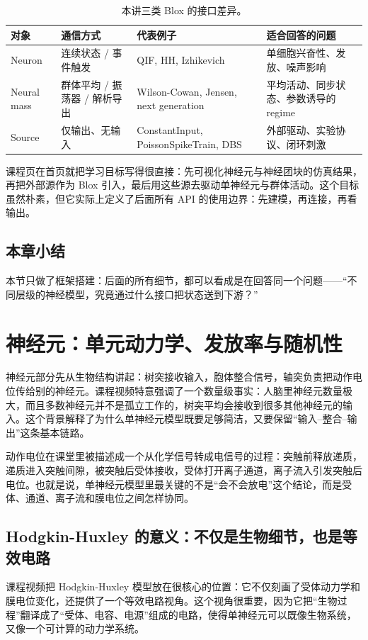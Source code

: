 \documentclass[a4paper]{article}
\begin{document}
\begin{table}[H]
\centering
\begin{tabular}{@{}llll@{}}
\toprule
对象 & 通信方式 & 代表例子 & 适合回答的问题 \\
\midrule
Neuron & 连续状态 / 事件触发 & QIF, HH, Izhikevich & 单细胞兴奋性、发放、噪声影响 \\
Neural mass & 群体平均 / 振荡器 / 解析导出 & Wilson-Cowan, Jensen, next generation & 平均活动、同步状态、参数诱导的 regime \\
Source & 仅输出、无输入 & ConstantInput, PoissonSpikeTrain, DBS & 外部驱动、实验协议、闭环刺激 \\
\bottomrule
\end{tabular}
\caption{本讲三类 Blox 的接口差异。}
\end{table}

课程页在首页就把学习目标写得很直接：先可视化神经元与神经团块的仿真结果，再把外部源作为 Blox 引入，最后用这些源去驱动单神经元与群体活动。这个目标虽然朴素，但它实际上定义了后面所有 API 的使用边界：先建模，再连接，再看输出。

\subsection{本章小结}
本节只做了框架搭建：后面的所有细节，都可以看成是在回答同一个问题——“不同层级的神经模型，究竟通过什么接口把状态送到下游？”

\section{神经元：单元动力学、发放率与随机性}
神经元部分先从生物结构讲起：树突接收输入，胞体整合信号，轴突负责把动作电位传给别的神经元。课程视频特意强调了一个数量级事实：人脑里神经元数量极大，而且多数神经元并不是孤立工作的，树突平均会接收到很多其他神经元的输入。这个背景解释了为什么单神经元模型既要足够简洁，又要保留“输入--整合--输出”这条基本链路。

动作电位在课堂里被描述成一个从化学信号转成电信号的过程：突触前释放递质，递质进入突触间隙，被突触后受体接收，受体打开离子通道，离子流入引发突触后电位。也就是说，单神经元模型里最关键的不是“会不会放电”这个结论，而是受体、通道、离子流和膜电位之间怎样协同。

\subsection{Hodgkin-Huxley 的意义：不仅是生物细节，也是等效电路}
课程视频把 Hodgkin-Huxley 模型放在很核心的位置：它不仅刻画了受体动力学和膜电位变化，还提供了一个等效电路视角。这个视角很重要，因为它把“生物过程”翻译成了“受体、电容、电源”组成的电路，使得单神经元可以既像生物系统，又像一个可计算的动力学系统。
\end{document}
